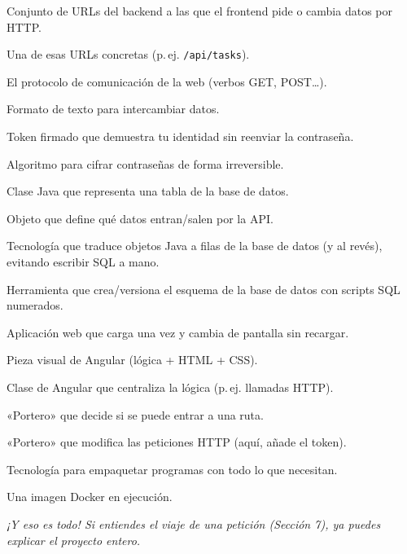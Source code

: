 \documentclass[11pt,a4paper]{article}
\begin{document}
\begin{description}[leftmargin=*, style=nextline]
  \item[API REST] Conjunto de URLs del backend a las que el frontend pide o
  cambia datos por HTTP.
  \item[Endpoint] Una de esas URLs concretas (p.\,ej. \verb|/api/tasks|).
  \item[HTTP] El protocolo de comunicación de la web (verbos GET, POST\ldots).
  \item[JSON] Formato de texto para intercambiar datos.
  \item[JWT] Token firmado que demuestra tu identidad sin reenviar la contraseña.
  \item[BCrypt] Algoritmo para cifrar contraseñas de forma irreversible.
  \item[Entidad] Clase Java que representa una tabla de la base de datos.
  \item[DTO] Objeto que define qué datos entran/salen por la API.
  \item[ORM / JPA] Tecnología que traduce objetos Java a filas de la base de
  datos (y al revés), evitando escribir SQL a mano.
  \item[Flyway] Herramienta que crea/versiona el esquema de la base de datos con
  scripts SQL numerados.
  \item[SPA] Aplicación web que carga una vez y cambia de pantalla sin recargar.
  \item[Componente] Pieza visual de Angular (lógica + HTML + CSS).
  \item[Servicio] Clase de Angular que centraliza la lógica (p.\,ej. llamadas HTTP).
  \item[Guard] «Portero» que decide si se puede entrar a una ruta.
  \item[Interceptor] «Portero» que modifica las peticiones HTTP (aquí, añade el token).
  \item[Docker] Tecnología para empaquetar programas con todo lo que necesitan.
  \item[Contenedor] Una imagen Docker en ejecución.
\end{description}

\vspace{1cm}
\begin{center}
\itshape ¡Y eso es todo! Si entiendes el viaje de una petición
(Sección 7), ya puedes explicar el proyecto entero.
\end{center}
\end{document}

